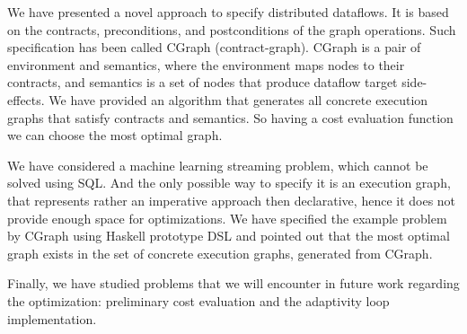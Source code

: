 We have presented a novel approach to specify distributed dataflows.
It is based on the contracts, preconditions, and postconditions of the graph operations.
Such specification has been called CGraph (contract-graph).
CGraph is a pair of environment and semantics, where the environment maps nodes to their contracts, and semantics is a set of nodes that produce dataflow target side-effects.
We have provided an algorithm that generates all concrete execution graphs that satisfy contracts and semantics.
So having a cost evaluation function we can choose the most optimal graph.

We have considered a machine learning streaming problem, which cannot be solved using SQL. %
And the only possible way to specify it is an execution graph, that represents rather an imperative approach then declarative, hence it does not provide enough space for optimizations.
We have specified the example problem by CGraph using Haskell prototype DSL and pointed out that the most optimal graph exists in the set of concrete execution graphs, generated from CGraph.

Finally, we have studied problems that we will encounter in future work regarding the optimization: preliminary cost evaluation and the adaptivity loop implementation.
